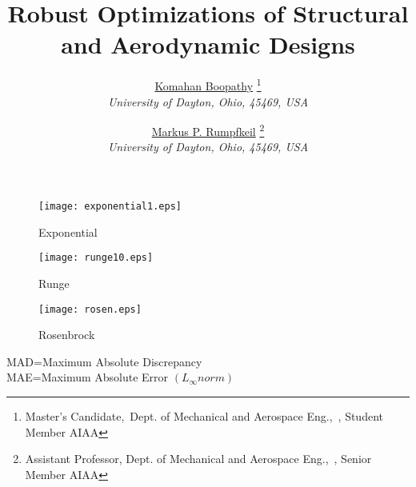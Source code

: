 \documentclass{report}
\title{Robust Optimizations of Structural and Aerodynamic Designs}
\author{
  \href{http://komahanboopathy.com/}{Komahan Boopathy} \thanks{Master's Candidate,~{Dept. of Mechanical and Aerospace Eng.},~\email{komahan.cool@gmail.com}, Student Member AIAA}\\
   {\normalsize \itshape {University of Dayton}, Ohio, 45469, USA}\\
   \and
   \href{http://academic.udayton.edu/markusrumpfkeil/}{Markus P. Rumpfkeil} \thanks{Assistant Professor, Dept. of Mechanical and Aerospace Eng.,~\email{Markus.Rumpfkeil@udayton.edu}, Senior Member AIAA} \\
   {\normalsize \itshape University of Dayton, Ohio, 45469, USA}\\
 }
\begin{document}
\maketitle

\setlength\abovedisplayskip{0pt}
\setlength\belowdisplayskip{0pt}


\begin{figure}[h!]
\centering
\begin{minipage}[b]{0.32\linewidth}
\texttt{[image: exponential1.eps]} \caption{Exponential}
\end{minipage}
\begin{minipage}[b]{0.32\linewidth}
\texttt{[image: runge10.eps]} \caption{Runge}
\end{minipage}
\begin{minipage}[b]{0.32\linewidth}
\texttt{[image: rosen.eps]} \caption{Rosenbrock}
\end{minipage}
\end{figure}
MAD=Maximum Absolute Discrepancy\\
MAE=Maximum Absolute Error $(L_\infty norm)$
\end{document}
